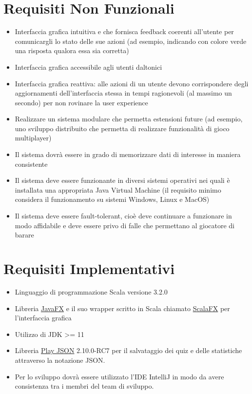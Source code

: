 \section{Requisiti Non Funzionali}
        \begin{itemize}
            \item Interfaccia grafica intuitiva e che fornisca feedback coerenti all'utente per comunicargli lo stato delle sue azioni (ad esempio, indicando con colore verde una risposta qualora essa sia corretta)
            \item Interfaccia grafica accessibile agli utenti daltonici
            \item Interfaccia grafica reattiva: alle azioni di un utente devono corrispondere degli aggiornamenti dell'interfaccia stessa in tempi ragionevoli (al massimo un secondo) per non rovinare la user experience
            
            \item Realizzare un sistema modulare che permetta estensioni future (ad esempio, uno sviluppo distribuito che permetta di realizzare funzionalità di gioco multiplayer)
            
            \item Il sistema dovrà essere in grado di memorizzare dati di interesse in maniera consistente
            
            \item Il sistema deve essere funzionante in diversi sistemi operativi nei quali è installata una appropriata Java Virtual Machine (il requisito minimo considera il funzionamento su sistemi Windows, Linux e MacOS)
            
            \item Il sistema deve essere fault-tolerant, cioè deve continuare a funzionare in modo affidabile e deve essere privo di falle che permettano al giocatore di barare
        
        \end{itemize}

\section{Requisiti Implementativi}
        \begin{itemize}
            \item Linguaggio di programmazione Scala versione 3.2.0
            \item Libreria \href{https://openjfx.io}{JavaFX} e il suo wrapper scritto in Scala chiamato \href{https://github.com/scalafx/scalafx}{ScalaFX} per l'interfaccia grafica
            \item Utilizzo di JDK >= 11
            \item Libreria \href{https://github.com/playframework/play-json}{Play JSON} 2.10.0-RC7 per il salvataggio dei quiz e delle statistiche attraverso la notazione JSON.
            \item Per lo sviluppo dovrà essere utilizzato l'IDE IntelliJ in modo da avere consistenza tra i membri del team di sviluppo.
        \end{itemize}

	